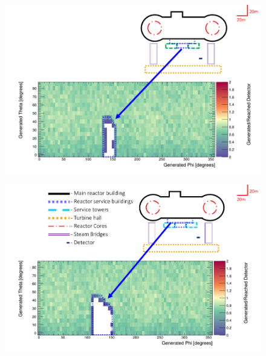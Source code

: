\begin{figure}[htbp]
 \centering
 \includegraphics[width=\linewidth]{Chapter5/Figs/wylfaRasterNew/serviceBuildClose.png}
 \label{fig:serviceBuildClose}
\end{figure}

\begin{figure}[htbp]
 \centering
 \includegraphics[width=\linewidth]{Chapter5/Figs/wylfaRasterNew/serviceBuildFar.png}
 \label{fig:serviceBuildFar}
\end{figure}

